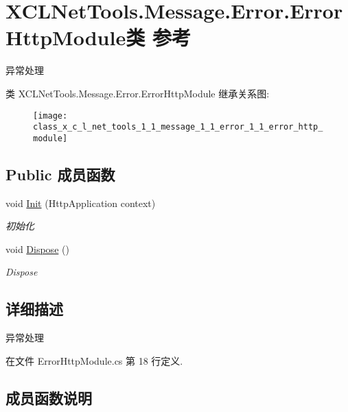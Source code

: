 \hypertarget{class_x_c_l_net_tools_1_1_message_1_1_error_1_1_error_http_module}{}\section{X\+C\+L\+Net\+Tools.\+Message.\+Error.\+Error\+Http\+Module类 参考}
\label{class_x_c_l_net_tools_1_1_message_1_1_error_1_1_error_http_module}


异常处理  


类 X\+C\+L\+Net\+Tools.\+Message.\+Error.\+Error\+Http\+Module 继承关系图\+:\begin{figure}[H]
\begin{center}
\leavevmode
\texttt{[image: class\_x\_c\_l\_net\_tools\_1\_1\_message\_1\_1\_error\_1\_1\_error\_http\_module]}
\end{center}
\end{figure}
\subsection*{Public 成员函数}
\begin{DoxyCompactItemize}
\item 
void \hyperlink{class_x_c_l_net_tools_1_1_message_1_1_error_1_1_error_http_module_aa4e06d53382795826ed453b62afa265d}{Init} (Http\+Application context)
\begin{DoxyCompactList}\small\item\em 初始化 \end{DoxyCompactList}\item 
void \hyperlink{class_x_c_l_net_tools_1_1_message_1_1_error_1_1_error_http_module_a796d6d747b8620b5e260858e05abd09f}{Dispose} ()
\begin{DoxyCompactList}\small\item\em Dispose \end{DoxyCompactList}\end{DoxyCompactItemize}


\subsection{详细描述}
异常处理 



在文件 Error\+Http\+Module.\+cs 第 18 行定义.



\subsection{成员函数说明}
\mbox{\label{class_x_c_l_net_tools_1_1_message_1_1_error_1_1_error_http_module_a796d6d747b8620b5e260858e05abd09f}} 

